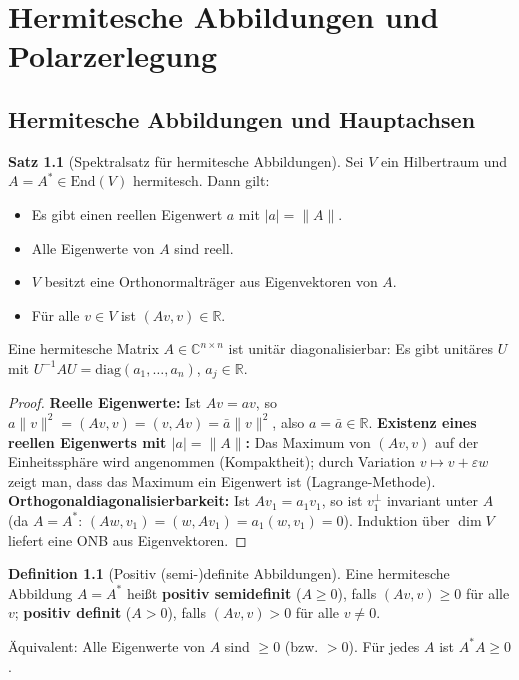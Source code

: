 ﻿\documentclass[a4paper,12pt]{report}
\theoremstyle{definition}
\newtheorem{definition}{Definition}
\newtheorem{satz}{Satz}
\begin{document}
\chapter{Hermitesche Abbildungen und Polarzerlegung}

\section{Hermitesche Abbildungen und Hauptachsen}


\begin{satz}[Spektralsatz für hermitesche Abbildungen]
    Sei $V$ ein Hilbertraum und $A = A^* \in \mathrm{End}(V)$
    hermitesch. Dann gilt:
    \begin{itemize}
        \item[-] Es gibt einen reellen Eigenwert $a$ mit $|a| = \|A\|$.
        \item[-] Alle Eigenwerte von $A$ sind reell.
        \item[-] $V$ besitzt eine Orthonormalträger aus Eigenvektoren von $A$.
        \item[-] Für alle $v \in V$ ist $(Av, v) \in \mathbb{R}$.
    \end{itemize}
    Eine hermitesche Matrix $A \in \mathbb{C}^{n \times n}$ ist unitär
    diagonalisierbar: Es gibt unitäres $U$ mit $U^{-1}AU = \mathrm{diag}(a_1, \dots, a_n)$,
    $a_j \in \mathbb{R}$.
\end{satz}
\begin{proof}
    \textbf{Reelle Eigenwerte:} Ist $Av = av$, so $a\|v\|^2 = (Av, v) = (v, Av) = \bar{a}\|v\|^2$,
    also $a = \bar{a} \in \mathbb{R}$.
    \textbf{Existenz eines reellen Eigenwerts mit $|a| = \|A\|$:}
    Das Maximum von $(Av, v)$ auf der Einheitssphäre wird angenommen
    (Kompaktheit); durch Variation $v \mapsto v + \varepsilon w$ zeigt man,
    dass das Maximum ein Eigenwert ist (Lagrange-Methode).
    \textbf{Orthogonaldiagonalisierbarkeit:} Ist $Av_1 = a_1 v_1$, so ist
    $v_1^\perp$ invariant unter $A$ (da $A = A^*$: $(Aw, v_1) = (w, Av_1) = a_1(w,v_1) = 0$).
    Induktion über $\dim V$ liefert eine ONB aus Eigenvektoren.
\end{proof}


\begin{definition}[Positiv (semi-)definite Abbildungen]
    Eine hermitesche Abbildung $A = A^*$ heißt \textbf{positiv semidefinit}
    ($A \geq 0$), falls $(Av, v) \geq 0$ für alle $v$;
    \textbf{positiv definit} ($A > 0$), falls $(Av, v) > 0$ für alle
    $v \neq 0$.

    Äquivalent: Alle Eigenwerte von $A$ sind $\geq 0$ (bzw. $> 0$).
    Für jedes $A$ ist $A^*A \geq 0$.
\end{definition}
\end{document}
